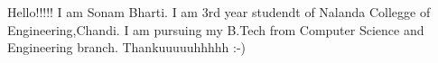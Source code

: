 \documentclass[12pt]{beamer}
\begin{document}
\begin{frame}
Hello!!!!!
I am Sonam Bharti.
I am 3rd year studendt of Nalanda Collegge of Engineering,Chandi.
I am pursuing my B.Tech from Computer Science and Engineering branch.
Thankuuuuuhhhhh :-)
\end{frame}
\end{document}
